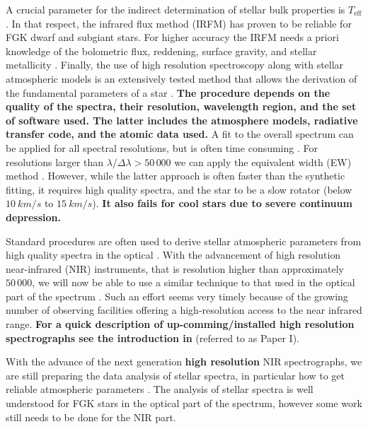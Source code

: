 \documentclass{aa}
\begin{document}
A crucial parameter for the indirect determination of stellar bulk properties is $T_\mathrm{eff}$.
In that respect, the infrared flux method (IRFM) has proven to be reliable for FGK dwarf and
subgiant stars. For higher accuracy the IRFM needs a priori knowledge of the bolometric flux,
reddening, surface gravity, and stellar metallicity
\citep{Blackwell1977,Ramirez2005b,Casagrande2010}. Finally, the use of high resolution spectroscopy
along with stellar atmospheric models is an extensively tested method that allows the derivation of
the fundamental parameters of a star \citep[see e.g.][]{Valenti2005,Santos13,Worley2016}. {\bf The
procedure depends on the quality of the spectra, their resolution, wavelength region, and the set of
software used. The latter includes the atmosphere models, radiative transfer code, and the atomic
data used.} A fit to the overall spectrum can be applied for all spectral resolutions, but is often
time consuming \citep[see e.g.][]{Recio2006,Tsantaki2017}. For resolutions larger than
$\lambda/\Delta\lambda > 50\,000$ we can apply the equivalent width (EW) method \citep[see e.g.][for
details]{Tsantaki2013,Andreasen2017a}. However, while the latter approach is often faster than the
synthetic fitting, it requires high quality spectra, and the star to be a slow rotator (below
$\SI{10}{km/s}$ to $\SI{15}{km/s}$). {\bf It also fails for cool stars due to severe continuum
depression.}

Standard procedures are often used to derive stellar atmospheric parameters from high quality
spectra in the optical \citep[see e.g.][]{Valenti2005,Sousa2008a}. With the advancement of high
resolution near-infrared (NIR) instruments, that is resolution higher than approximately $50\,000$,
we will now be able to use a similar technique to that used in the optical part of the spectrum
\citep[see e.g.][]{Melendez1999,Sousa2008a,Tsantaki2013,Mucciarelli2013,Bensby2014,Andreasen2017a}.
Such an effort seems very timely because of the growing number of observing facilities offering a
high-resolution access to the near infrared range. {\bf For a quick description of
up-comming/installed high resolution spectrographs see the introduction in} \citet{Andreasen2016}
(referred to as Paper I).

With the advance of the next generation {\bf high resolution} NIR spectrographs, we are still
preparing the data analysis of stellar spectra, in particular how to get reliable atmospheric
parameters \citep[see e.g.][]{Onehag2012,Lindgren2016,Andreasen2016}. The analysis of stellar
spectra is well understood for FGK stars in the optical part of the spectrum, however some work
still needs to be done for the NIR part.
\end{document}

